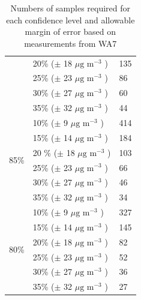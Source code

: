 \begin{table}[H]
\begin{tabular}{|l|l|l|}
                        &            20\% ($\pm$ 18  $\mu \text{g m}^{-3}$ )    &        135                   \\ \cline{2-3} 
                        &            25\% ($\pm$ 23  $\mu \text{g m}^{-3}$ )    &        86                    \\ \cline{2-3} 
                        &            30\% ($\pm$ 27  $\mu \text{g m}^{-3}$ )    &        60                    \\ \cline{2-3} 
                        &            35\% ($\pm$ 32  $\mu \text{g m}^{-3}$ )    &        44                    \\ \hline
\multirow{6}{*}{85\%}   &            10\% ($\pm$ 9   $\mu \text{g m}^{-3}$ )    &        414                   \\ \cline{2-3} 
                        &            15\% ($\pm$ 14  $\mu \text{g m}^{-3}$ )    &        184                   \\ \cline{2-3} 
                        &            20 \% ($\pm$ 18 $\mu \text{g m}^{-3}$ )    &        103                   \\ \cline{2-3} 
                        &            25\% ($\pm$ 23  $\mu \text{g m}^{-3}$ )    &        66                    \\ \cline{2-3} 
                        &            30\% ($\pm$ 27  $\mu \text{g m}^{-3}$ )    &        46                    \\ \cline{2-3} 
                        &            35\% ($\pm$ 32  $\mu \text{g m}^{-3}$ )    &        34                    \\ \hline
\multirow{6}{*}{80\%}   &            10\% ($\pm$ 9   $\mu \text{g m}^{-3}$ )    &        327                   \\ \cline{2-3} 
                        &            15\% ($\pm$ 14  $\mu \text{g m}^{-3}$ )    &        145                   \\ \cline{2-3} 
                        &            20\% ($\pm$ 18  $\mu \text{g m}^{-3}$ )    &        82                    \\ \cline{2-3} 
                        &            25\% ($\pm$ 23  $\mu \text{g m}^{-3}$ )    &        52                    \\ \cline{2-3} 
                        &            30\% ($\pm$ 27  $\mu \text{g m}^{-3}$ )    &        36                    \\ \cline{2-3} 
                        &            35\% ($\pm$ 32   $\mu \text{g m}^{-3}$ )   &        27                    \\ \hline
\end{tabular}
\caption{Numbers of samples required for each confidence level and allowable margin of error based on measurements from WA7}
\label{tab:no2_samples_needed}
\end{table}

